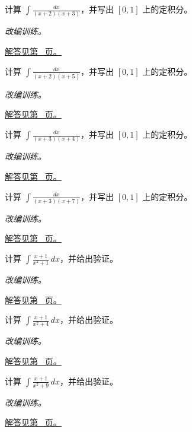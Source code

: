 \documentclass[12pt,fontset=fandol]{ctexart}
\begin{document}
\begin{example}[互异一次因子的部分分式]\label{ex:c13q15}
计算 $\displaystyle\int\frac{dx}{(x+2)(x+3)}$，并写出 $[0,1]$ 上的定积分。
\par\textit{改编训练。}\par\hyperref[ans:c13q15]{解答见第~\pageref{ans:c13q15} 页。}
\end{example}
\begin{example}[互异一次因子的部分分式]\label{ex:c13q16}
计算 $\displaystyle\int\frac{dx}{(x+2)(x+5)}$，并写出 $[0,1]$ 上的定积分。
\par\textit{改编训练。}\par\hyperref[ans:c13q16]{解答见第~\pageref{ans:c13q16} 页。}
\end{example}
\begin{example}[互异一次因子的部分分式]\label{ex:c13q17}
计算 $\displaystyle\int\frac{dx}{(x+3)(x+4)}$，并写出 $[0,1]$ 上的定积分。
\par\textit{改编训练。}\par\hyperref[ans:c13q17]{解答见第~\pageref{ans:c13q17} 页。}
\end{example}
\begin{example}[互异一次因子的部分分式]\label{ex:c13q18}
计算 $\displaystyle\int\frac{dx}{(x+3)(x+7)}$，并写出 $[0,1]$ 上的定积分。
\par\textit{改编训练。}\par\hyperref[ans:c13q18]{解答见第~\pageref{ans:c13q18} 页。}
\end{example}
\begin{example}[不可约二次因子的积分]\label{ex:c13q19}
计算 $\displaystyle\int\frac{x+1}{x^2+1}\,dx$，并给出验证。
\par\textit{改编训练。}\par\hyperref[ans:c13q19]{解答见第~\pageref{ans:c13q19} 页。}
\end{example}
\begin{example}[不可约二次因子的积分]\label{ex:c13q20}
计算 $\displaystyle\int\frac{x+1}{x^2+4}\,dx$，并给出验证。
\par\textit{改编训练。}\par\hyperref[ans:c13q20]{解答见第~\pageref{ans:c13q20} 页。}
\end{example}
\begin{example}[不可约二次因子的积分]\label{ex:c13q21}
计算 $\displaystyle\int\frac{x+1}{x^2+9}\,dx$，并给出验证。
\par\textit{改编训练。}\par\hyperref[ans:c13q21]{解答见第~\pageref{ans:c13q21} 页。}
\end{example}
\end{document}

